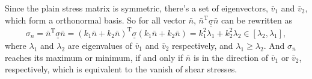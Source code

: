 \documentclass{article}
\begin{document}
Since the plain stress matrix is symmetric, there's a set of eigenvectors, $\bar{v}_{1}$ and $\bar{v}_{2}$, which form a orthonormal basis. So for all vector $\bar{n}$, $\bar{n}^{\mathrm{T}} \underline{\underline{\sigma}} \bar{n}$ can be rewritten as
\[
\sigma_{n} = \bar{n}^{\mathrm{T}} \underline{\underline{\sigma}} \bar{n} = 
(k_{1} \bar{n} + k_{2} \bar{n})^{\mathrm{T}} \underline{\underline{\sigma}} (k_{1} \bar{n} + k_{2} \bar{n}) = k_{1}^2 \lambda_{1} + k_{2}^2 \lambda_{2} \in [\lambda_{2}, \lambda_{1}],
\]
where $\lambda_{1}$ and $\lambda_{2}$ are eigenvalues of $\bar{v}_{1}$ and $\bar{v}_{2}$ respectively, and $\lambda_{1} \ge \lambda_{2}$. And $\sigma_{n}$ reaches its maximum or minimum, if and only if $\bar{n}$ is in the direction of $\bar{v}_{1}$ or $\bar{v}_{2}$, respectively, which is equivalent to the vanish of shear stresses.
\end{document}
